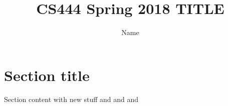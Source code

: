 \documentclass[10pt,letterpaper,draftclsnofoot,onecolumn]{IEEEtran}
\begin{document}
\begin{singlespace}
\begin{titlepage}
\title{CS444 Spring 2018 TITLE}
\author{Name}
\maketitle
\thispagestyle{empty}
\end{titlepage}

\section{Section title}
Section content with new stuff \cite{r1} and \cite{r2} and \cite{r3} and \cite{r4}

\end{singlespace}



\end{document}
